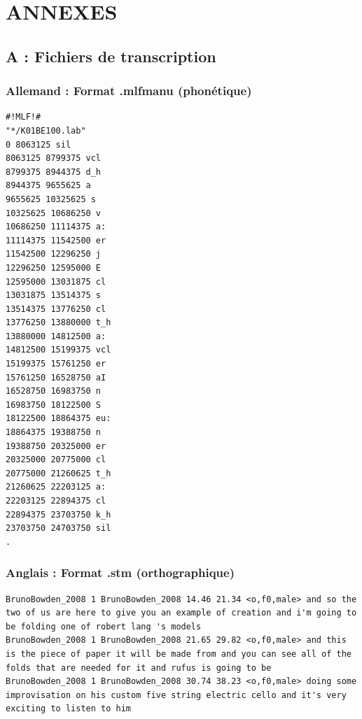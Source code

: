 \documentclass{article}
\begin{document}
\newpage



\thispagestyle{empty}

\newpage

\section*{ANNEXES}
\setcounter{page}{1}

\subsection*{A : Fichiers de transcription}
\subsubsection*{Allemand : Format .mlfmanu (phonétique)}

\begin{lstlisting}[basicstyle=\sffamily, columns=flexible]
#!MLF!#
"*/K01BE100.lab"
0 8063125 sil
8063125 8799375 vcl
8799375 8944375 d_h
8944375 9655625 a
9655625 10325625 s
10325625 10686250 v
10686250 11114375 a:
11114375 11542500 er
11542500 12296250 j
12296250 12595000 E
12595000 13031875 cl
13031875 13514375 s
13514375 13776250 cl
13776250 13880000 t_h
13880000 14812500 a:
14812500 15199375 vcl
15199375 15761250 er
15761250 16528750 aI
16528750 16983750 n
16983750 18122500 S
18122500 18864375 eu:
18864375 19388750 n
19388750 20325000 er
20325000 20775000 cl
20775000 21260625 t_h
21260625 22203125 a:
22203125 22894375 cl
22894375 23703750 k_h
23703750 24703750 sil
.
\end{lstlisting}

\subsubsection*{Anglais : Format .stm (orthographique)}

\begin{lstlisting}[breaklines=true,basicstyle=\sffamily, columns=flexible]
BrunoBowden_2008 1 BrunoBowden_2008 14.46 21.34 <o,f0,male> and so the two of us are here to give you an example of creation and i'm going to be folding one of robert lang 's models
BrunoBowden_2008 1 BrunoBowden_2008 21.65 29.82 <o,f0,male> and this is the piece of paper it will be made from and you can see all of the folds that are needed for it and rufus is going to be
BrunoBowden_2008 1 BrunoBowden_2008 30.74 38.23 <o,f0,male> doing some improvisation on his custom five string electric cello and it's very exciting to listen to him
\end{lstlisting}
\end{document}
